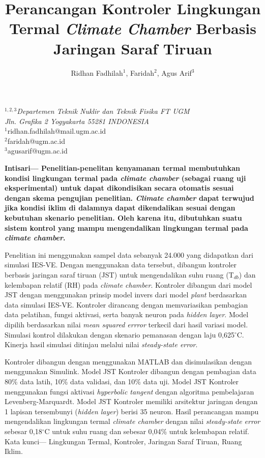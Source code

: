 \documentclass[a4paper,10pt]{article}
\title{\fontsize{24}{28}\selectfont Perancangan Kontroler Lingkungan Termal \textit{Climate Chamber} Berbasis Jaringan Saraf Tiruan}
\author{\fontsize{11}{11}\selectfont Ridhan Fadhilah$^1$, Faridah$^2$, Agus Arif$^3$}
\date{}
\begin{document}
	\setlength{\abovedisplayskip}{1pt}
	\setlength{\belowdisplayskip}{1pt}	
	
	\maketitle
	
	\vspace{-1.5cm}
	
	{\centering
		{\itshape\fontsize{10}{10}\selectfont
			$^{1,2,3}$Departemen Teknik Nuklir dan Teknik Fisika FT UGM\\
			Jln. Grafika 2 Yogyakarta 55281 INDONESIA\\
		}
		{\fontsize{9}{9}\normalfont\selectfont
			$^1$ridhan.fadhilah@mail.ugm.ac.id\\
			$^2$faridah@ugm.ac.id\\
			$^3$agusarif@ugm.ac.id\\
		}
	}
	
	\vspace{0.3cm}
	
	{\setlength{\parindent}{0cm}\bfseries
		Intisari--- Penelitian-penelitan kenyamanan termal membutuhkan kondisi lingkungan termal pada \textit{climate chamber} (sebagai ruang uji eksperimental) untuk dapat dikondisikan secara otomatis sesuai dengan skema pengujian penelitian. \textit{Climate chamber} dapat terwujud jika kondisi iklim di dalamnya dapat dikendalikan sesuai dengan kebutuhan skenario penelitian. Oleh karena itu, dibutuhkan suatu sistem kontrol yang mampu mengendalikan lingkungan termal pada \textit{climate chamber}.
		
		\qquad Penelitian ini menggunakan sampel data sebanyak 24.000 yang didapatkan dari simulasi IES-VE. Dengan menggunakan data tersebut, dibangun kontroler berbasis jaringan saraf tiruan (JST) untuk mengendalikan suhu ruang (T$_{db}$) dan kelembapan relatif (RH) pada \textit{climate chamber}. Kontroler dibangun dari model JST dengan menggunakan prinsip model invers dari model \textit{plant} berdasarkan data simulasi IES-VE. Kontroler dirancang dengan memvariasikan pembagian data pelatihan, fungsi aktivasi, serta banyak neuron pada \textit{hidden layer}. Model dipilih berdasarkan nilai \textit{mean squared errror} terkecil dari hasil variasi model. Simulasi kontrol dilakukan dengan skenario pemanasan dengan laju 0,625$^\circ$C. Kinerja hasil simulasi ditinjau melalui nilai \textit{steady-state error}.
		
		\qquad Kontroler dibangun dengan menggunakan MATLAB dan disimulasikan dengan menggunakan Simulink. Model JST Kontroler dibangun dengan pembagian data 80\% data latih, 10\% data validasi, dan 10\% data uji. Model JST Kontroler menggunakan fungsi aktivasi \textit{hyperbolic tangent} dengan algoritma pembelajaran Levenberg-Marquardt. Model JST Kontroler memiliki arsitektur jaringan dengan 1 lapisan tersembunyi (\textit{hidden layer}) berisi 35 neuron. Hasil perancangan mampu mengendalikan lingkungan termal \textit{climate chamber} dengan nilai \textit{steady-state error} sebesar 0,18$^\circ$C untuk suhu ruang dan sebesar 0,04\% untuk kelembapan relatif.\\
		
		Kata kunci--- Lingkungan Termal, Kontroler, Jaringan Saraf Tiruan, Ruang Iklim.
	}
	
\end{document}
